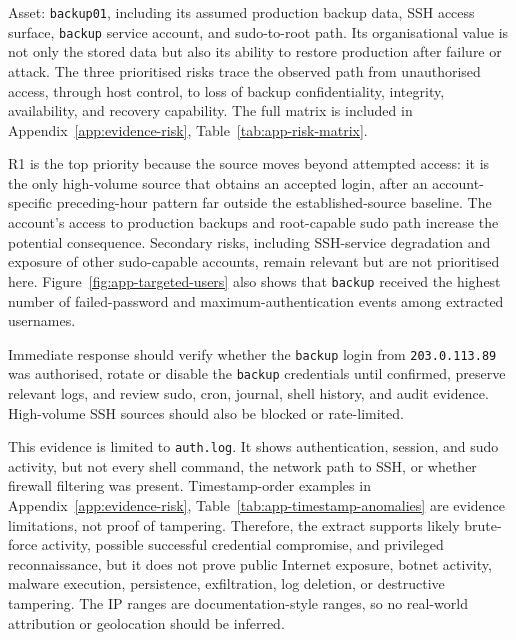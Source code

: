 
Asset: \texttt{backup01}, including its assumed production backup data, SSH access surface, \texttt{backup} service account, and sudo-to-root path. Its organisational value is not only the stored data but also its ability to restore production after failure or attack. The three prioritised risks trace the observed path from unauthorised access, through host control, to loss of backup confidentiality, integrity, availability, and recovery capability. The full matrix is included in Appendix~\ref{app:evidence-risk}, Table~\ref{tab:app-risk-matrix}.

R1 is the top priority because the source moves beyond attempted access: it is the only high-volume source that obtains an accepted login, after an account-specific preceding-hour pattern far outside the established-source baseline. The account's access to production backups and root-capable sudo path increase the potential consequence. Secondary risks, including SSH-service degradation and exposure of other sudo-capable accounts, remain relevant but are not prioritised here. Figure~\ref{fig:app-targeted-users} also shows that \texttt{backup} received the highest number of failed-password and maximum-authentication events among extracted usernames.

Immediate response should verify whether the \texttt{backup} login from \texttt{203.0.113.89} was authorised, rotate or disable the \texttt{backup} credentials until confirmed, preserve relevant logs, and review sudo, cron, journal, shell history, and audit evidence. High-volume SSH sources should also be blocked or rate-limited.

This evidence is limited to \texttt{auth.log}. It shows authentication, session, and sudo activity, but not every shell command, the network path to SSH, or whether firewall filtering was present. Timestamp-order examples in Appendix~\ref{app:evidence-risk}, Table~\ref{tab:app-timestamp-anomalies} are evidence limitations, not proof of tampering. Therefore, the extract supports likely brute-force activity, possible successful credential compromise, and privileged reconnaissance, but it does not prove public Internet exposure, botnet activity, malware execution, persistence, exfiltration, log deletion, or destructive tampering. The IP ranges are documentation-style ranges, so no real-world attribution or geolocation should be inferred.
